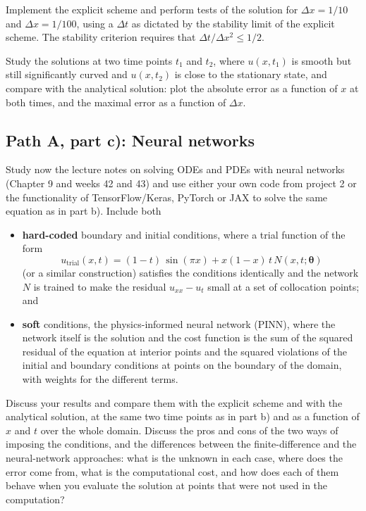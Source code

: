 \documentclass[11pt,a4paper]{article}
\begin{document}
Implement the explicit scheme and perform tests of the solution for
$\Delta x = 1/10$ and $\Delta x = 1/100$, using a $\Delta t$ as dictated by
the stability limit of the explicit scheme.  The stability criterion
requires that $\Delta t/\Delta x^2 \le 1/2$.

Study the solutions at two time points $t_1$ and $t_2$, where $u(x,t_1)$ is
smooth but still significantly curved and $u(x,t_2)$ is close to the
stationary state, and compare with the analytical solution: plot the
absolute error as a function of $x$ at both times, and the maximal error as
a function of $\Delta x$.

\subsection*{Path A, part c): Neural networks}

Study now the lecture notes on solving ODEs and PDEs with neural networks
(Chapter 9 and weeks 42 and 43) and use either your own code from project 2
or the functionality of TensorFlow/Keras, PyTorch or JAX to solve the same
equation as in part b).  Include both
\begin{itemize}[nosep]
  \item \textbf{hard-coded} boundary and initial conditions, where a trial
        function of the form
        \[
          u_{\mathrm{trial}}(x,t) = (1-t)\,\sin(\pi x) + x(1-x)\,t\,N(x,t;\bm{\theta})
        \]
        (or a similar construction) satisfies the conditions identically and
        the network $N$ is trained to make the residual $u_{xx}-u_t$ small at
        a set of collocation points; and
  \item \textbf{soft} conditions, the physics-informed neural network (PINN),
        where the network itself is the solution and the cost function is the
        sum of the squared residual of the equation at interior points and the
        squared violations of the initial and boundary conditions at points on
        the boundary of the domain, with weights for the different terms.
\end{itemize}
Discuss your results and compare them with the explicit scheme and with the
analytical solution, at the same two time points as in part b) and as a
function of $x$ and $t$ over the whole domain.  Discuss the pros and cons of
the two ways of imposing the conditions, and the differences between the
finite-difference and the neural-network approaches: what is the unknown in
each case, where does the error come from, what is the computational cost,
and how does each of them behave when you evaluate the solution at points
that were not used in the computation?
\end{document}
